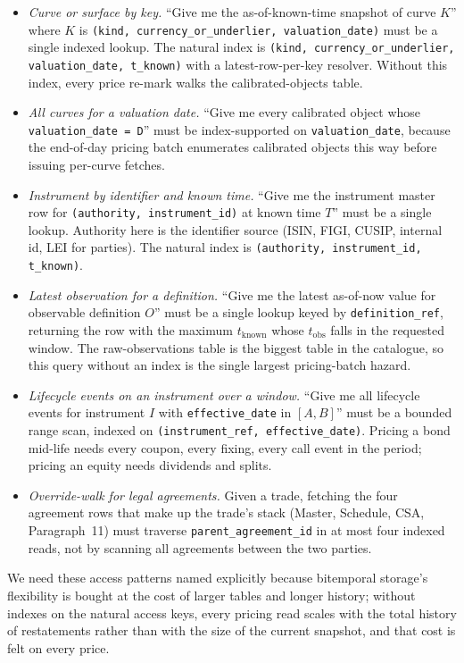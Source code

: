 \documentclass[11pt,a4paper]{article}
\begin{document}
\begin{itemize}
\item \emph{Curve or surface by key.} ``Give me the as-of-known-time snapshot of curve $K$'' where $K$ is \texttt{(kind, currency\_or\_underlier, valuation\_date)} must be a single indexed lookup. The natural index is \texttt{(kind, currency\_or\_underlier, valuation\_date, t\_known)} with a latest-row-per-key resolver. Without this index, every price re-mark walks the calibrated-objects table.
\item \emph{All curves for a valuation date.} ``Give me every calibrated object whose \texttt{valuation\_date = D}'' must be index-supported on \texttt{valuation\_date}, because the end-of-day pricing batch enumerates calibrated objects this way before issuing per-curve fetches.
\item \emph{Instrument by identifier and known time.} ``Give me the instrument master row for \texttt{(authority, instrument\_id)} at known time $T$'' must be a single lookup. Authority here is the identifier source (ISIN, FIGI, CUSIP, internal id, LEI for parties). The natural index is \texttt{(authority, instrument\_id, t\_known)}.
\item \emph{Latest observation for a definition.} ``Give me the latest as-of-now value for observable definition $O$'' must be a single lookup keyed by \texttt{definition\_ref}, returning the row with the maximum $t_\text{known}$ whose $t_\text{obs}$ falls in the requested window. The raw-observations table is the biggest table in the catalogue, so this query without an index is the single largest pricing-batch hazard.
\item \emph{Lifecycle events on an instrument over a window.} ``Give me all lifecycle events for instrument $I$ with \texttt{effective\_date} in $[A, B]$'' must be a bounded range scan, indexed on \texttt{(instrument\_ref, effective\_date)}. Pricing a bond mid-life needs every coupon, every fixing, every call event in the period; pricing an equity needs dividends and splits.
\item \emph{Override-walk for legal agreements.} Given a trade, fetching the four agreement rows that make up the trade's stack (Master, Schedule, CSA, Paragraph~11) must traverse \texttt{parent\_agreement\_id} in at most four indexed reads, not by scanning all agreements between the two parties.
\end{itemize}

We need these access patterns named explicitly because bitemporal storage's flexibility is bought at the cost of larger tables and longer history; without indexes on the natural access keys, every pricing read scales with the total history of restatements rather than with the size of the current snapshot, and that cost is felt on every price.
\end{document}
